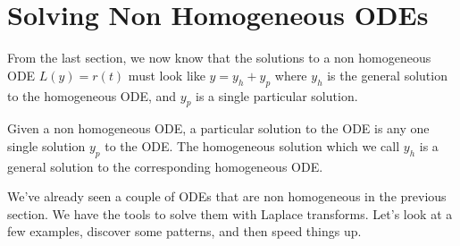% 
%  
% 


\section{Solving Non Homogeneous ODEs}

From the last section, we now know that the solutions to a non homogeneous ODE  $L(y)=r(t)$ must look like $y=y_h+y_p$ where $y_h$ is the general solution to the homogeneous ODE, and $y_p$ is a single particular solution.  
\begin{definition}
 Given a non homogeneous ODE, a particular solution to the ODE is any one single solution $y_p$  to the ODE.  The homogeneous solution which we call $y_h$ is a general solution to the corresponding homogeneous ODE.
\end{definition}
We've already seen a couple of ODEs that are non homogeneous in the previous section. We have the tools to solve them with Laplace transforms.  Let's look at a few examples, discover some patterns, and then speed things up.

